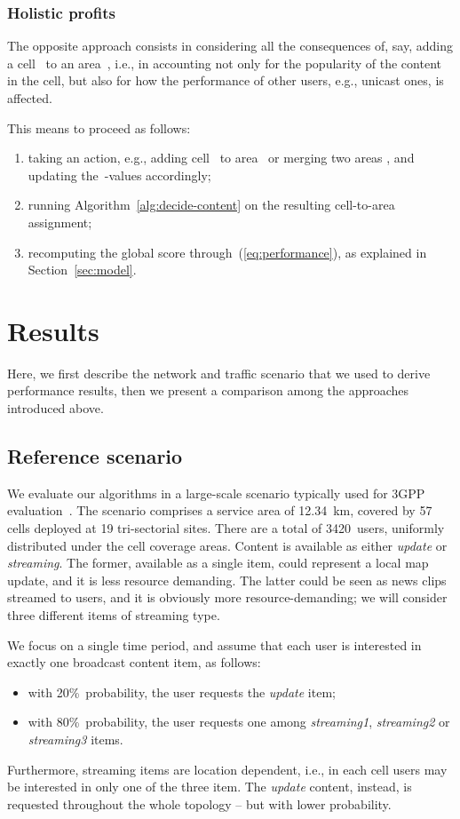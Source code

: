 \documentclass[10pt, conference, compsocconf]{IEEEtran}
\numberwithin{equation}{section}
\begin{document}
\subsubsection{Holistic profits}

The opposite approach consists in considering all the consequences of, say, adding a cell~
to an area~, i.e., in accounting not only  for the popularity of
the content in the cell, but also  for how
the performance of other users, e.g., unicast ones, is affected.

This means to proceed as follows:
\begin{enumerate}
\item taking an action, e.g., adding cell~ to area~ or merging two areas ,
and updating the~-values accordingly;
\item running Algorithm~\ref{alg:decide-content} on the resulting cell-to-area assignment;
\item recomputing the global score through~(\ref{eq:performance}), as explained in 
Section~\ref{sec:model}.
\end{enumerate}


\section{Results
\label{sec:results}
}

Here, we first describe the network and traffic scenario that we used
to derive performance results, then we present a  comparison among the
approaches introduced 
above. 

\subsection{Reference scenario}

We evaluate our algorithms in a large-scale scenario typically used for
3GPP evaluation~\cite{scenario}. The scenario comprises a service area
of 12.34~km, covered by 57 cells deployed at 19 tri-sectorial sites.
There are a total of 3420~users, uniformly distributed under the cell
coverage areas. Content is available as either {\em update} or 
{\em streaming}. The former, available as a single item, 
could represent a local map update, 
and it is less resource demanding. The latter could
be seen as news clips streamed to users, and it is obviously more
resource-demanding; we will consider three different items of streaming type.

We focus on a single time period, and assume that each user is interested in exactly one 
broadcast content item, as follows:
\begin{itemize}
\item with 20\%~probability, the user requests the {\em update} item;
\item with 80\%~probability, the user requests one among 
{\em streaming1}, {\em streaming2} or {\em streaming3} items.
\end{itemize}
Furthermore, streaming items are location dependent, i.e., in each
cell users may be interested in only one of the three item. The {\em
  update} content, instead, 
is requested throughout the whole topology -- but with lower probability.
\end{document}
